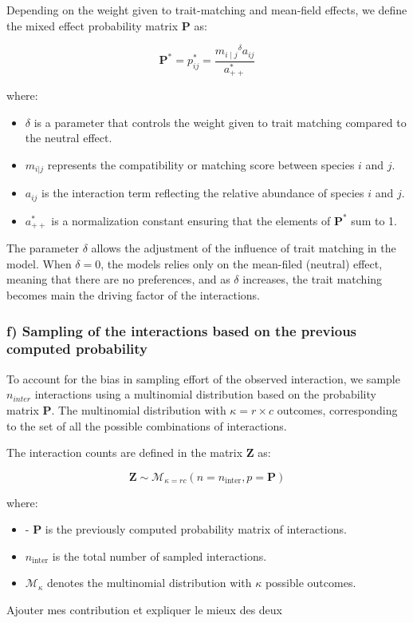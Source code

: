 Depending on the weight given to trait-matching and mean-field effects, we define the mixed effect probability matrix $\mathbf{P}$ as: 

$$
    \mathbf{P}^* = p^*_{ij} = \frac{{m_{i\mid j}}^\delta a_{ij}}{a_{++}^*}
$$

where:
\begin{itemize}
\item  \(\delta\) is a parameter that controls the weight given to trait matching compared to the neutral effect.
\item  \(m_{i|j}\) represents the compatibility or matching score between species \(i\) and \(j\).
\item  \(a_{ij}\) is the interaction term reflecting the relative abundance of species \(i\) and \(j\).
\item  \(a_{++}^*\) is a normalization constant ensuring that the elements of \(\mathbf{P}^*\) sum to 1.
\end{itemize}

The parameter $\delta$ allows the adjustment of the influence of trait matching in the model. When $\delta = 0$, the models relies only on the mean-filed (neutral) effect, meaning that there are no preferences, and as $\delta$ increases, the trait matching becomes main the driving factor of the interactions.



\subsubsection{f) Sampling of the interactions based on the previous computed probability}

To account for the bias in sampling effort of the observed interaction, we sample $n_{inter}$ interactions using a multinomial distribution based on the probability matrix $\mathbf{P}$. The multinomial distribution with $\kappa = r \times c$ outcomes, corresponding to the set of all the possible combinations of interactions.

The interaction counts are defined in the matrix $\mathbf{Z}$ as:

$$
    \mathbf{Z} \sim \mathcal{M}_{\kappa = rc}(n = n_\text{inter}, p = \mathbf{P})
$$

where:
\begin{itemize}
    \item - \(\mathbf{P}\) is the previously computed probability matrix of interactions.
    \item  \(n_{\text{inter}}\) is the total number of sampled interactions.
    \item  \(\mathcal{M}_{\kappa}\) denotes the multinomial distribution with \(\kappa\) possible outcomes.
\end{itemize}



Ajouter mes contribution et expliquer le mieux des deux